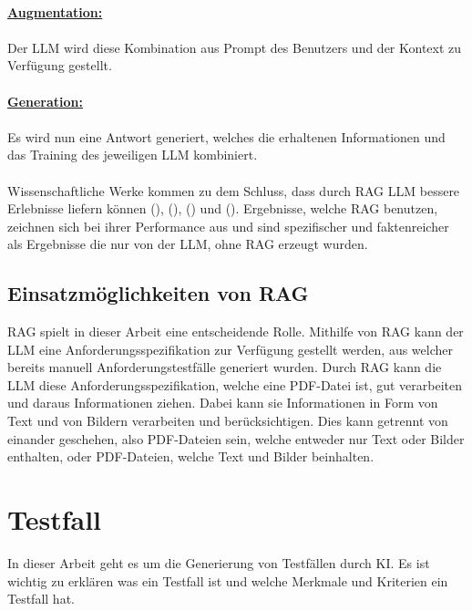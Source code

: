 \documentclass[12pt,toc=bib,toc=listof]{scrreprt}
\begin{document}
\\
\textbf{\underline{Augmentation:}}\\
\\
Der LLM wird diese Kombination aus Prompt des Benutzers und der Kontext zu Verfügung gestellt.\\
\\
\textbf{\underline{Generation:}}\\
\\
Es wird nun eine Antwort generiert, welches die erhaltenen Informationen und das Training des jeweiligen LLM kombiniert.\\
\\
Wissenschaftliche Werke kommen zu dem Schluss, dass durch RAG LLM bessere Erlebnisse liefern können (\cite{Gao2024}), (\cite{Lewis2021}), (\cite{Salemi2024}) und (\cite{Wu2024}). Ergebnisse, welche RAG benutzen, zeichnen sich bei ihrer Performance aus und sind spezifischer und faktenreicher als Ergebnisse die nur von der LLM, ohne RAG erzeugt wurden.

\subsection{Einsatzmöglichkeiten von RAG} %
\label{sec:einsatzmöglichkeitenVonRAG}
RAG spielt in dieser Arbeit eine entscheidende Rolle. Mithilfe von RAG kann der LLM eine Anforderungsspezifikation zur Verfügung gestellt werden, aus welcher bereits manuell Anforderungstestfälle generiert wurden. Durch RAG kann die LLM diese Anforderungsspezifikation, welche eine PDF-Datei ist, gut verarbeiten und daraus Informationen ziehen. Dabei kann sie Informationen in Form von Text und von Bildern verarbeiten und berücksichtigen. Dies kann getrennt von einander geschehen, also PDF-Dateien sein, welche entweder nur Text oder Bilder enthalten, oder PDF-Dateien, welche Text und Bilder beinhalten.

\section{Testfall} %
\label{sec:testfall}
In dieser Arbeit geht es um die Generierung von Testfällen durch KI. Es ist wichtig zu erklären was ein Testfall ist und welche Merkmale und Kriterien ein Testfall hat. 
\end{document}
